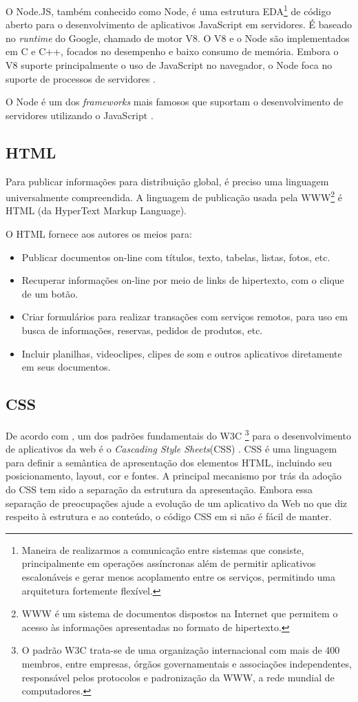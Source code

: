 O Node.JS, também conhecido como Node, é uma estrutura EDA\footnote{Maneira de realizarmos a comunicação entre sistemas que consiste, principalmente em operações assíncronas além de permitir aplicativos escalonáveis e gerar menos acoplamento entre os serviços, permitindo uma arquitetura fortemente flexível.} de código aberto para o desenvolvimento de aplicativos JavaScript em servidores. É baseado no \textit{runtime} do Google, chamado de motor V8. O V8 e o Node são implementados em C e C++, focados no desempenho e baixo consumo de memória. Embora o V8 suporte principalmente o uso de JavaScript no navegador, o Node foca no suporte de processos de servidores \cite{Tilkov2010}.


O Node é um dos \textit{frameworks} mais famosos que suportam o desenvolvimento de servidores utilizando o JavaScript \cite{Tilkov2010}.

\subsection{HTML}

Para publicar informações para distribuição global, é preciso uma linguagem universalmente compreendida. A linguagem de publicação usada pela WWW\footnote{WWW é um sistema de documentos dispostos na Internet que permitem o acesso às informações apresentadas no formato de hipertexto.} é HTML (da HyperText Markup Language).\citeauthor{html}

O HTML fornece aos autores os meios para: 
\begin{itemize}
    \item Publicar documentos on-line com títulos, texto, tabelas, listas, fotos, etc. 
    \item Recuperar informações on-line por meio de links de hipertexto, com o clique de um botão. 
    \item Criar formulários para realizar transações com serviços remotos, para uso em busca de informações, reservas, pedidos de produtos, etc. 
    \item Incluir planilhas, videoclipes, clipes de som e outros aplicativos diretamente em seus documentos.
\end{itemize}

\subsection{CSS}
De acordo com \citeauthor{css}, um dos padrões fundamentais do W3C \footnote{O padrão W3C trata-se de uma organização internacional com mais de 400 membros, entre empresas, órgãos governamentais e associações independentes, responsável pelos protocolos e padronização da WWW, a rede mundial de computadores.} para o desenvolvimento de aplicativos da web é o \textit{Cascading Style Sheets}(CSS) \cite{Casca8378199:online}. CSS é uma linguagem para definir a semântica de apresentação dos elementos HTML, incluindo seu posicionamento, layout, cor e fontes. A principal mecanismo por trás da adoção do CSS tem sido a separação da estrutura da apresentação. Embora essa separação de preocupações ajude a evolução de um aplicativo da Web no que diz respeito à estrutura e ao conteúdo, o código CSS em si não é fácil de manter.\cite{badros1999constraint}

